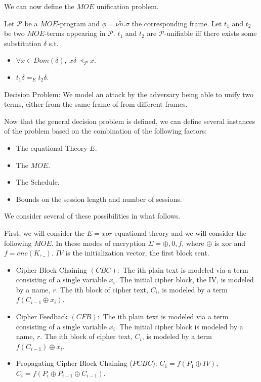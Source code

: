 \documentclass{llncs}
\begin{document}
We can now define the $MOE$ unification problem.

\begin{definition}
	Let $\mathcal{P}$ be a $MOE$-program and $\phi = \nu \tilde{n}.\sigma$ the corresponding frame. Let $t_1$ and $t_2$
	be two $MOE$-terms appearing in $\mathcal{P}$. $t_1$ and $t_2$
	are $\mathcal{P}$-unifiable iff there exists some substitution
	$\delta$ s.t.
	\begin{itemize}
		\item $\forall x \in Dom(\delta), ~x\delta \prec_{\mathcal{P}} x$.
		\item $t_1 \delta =_E t_2\delta$.
	\end{itemize}
\end{definition}


\begin{definition}
	Decision Problem: We model an attack by the adversary being able
	to unify two terms, either from the same frame of from different
	frames.  
\end{definition}

Now that the general decision problem is defined, we can define several
instances of the problem based on the combination of the following factors:
\begin{itemize}
	\item The equational Theory $E$.
	\item The $MOE$.
	\item The Schedule.
	\item Bounds on the session length and number of sessions.  
\end{itemize}

We consider several of these possibilities in what follows.

First, we will consider the $E=xor$ equational theory and we 
will consider the following $MOE$. In these modes of encryption 
$\Sigma ={\oplus, 0, f}$, where $\oplus$ is xor and $f=enc(K,\_)$.
$IV$ is the initialization vector, the first block sent. 
\begin{itemize}
	\item Cipher Block Chaining $(CBC):$ The ith plain text is modeled via a term consisting of a single variable $x_i$. The initial cipher block, the IV, is modeled by a name, $r$. The ith block of cipher text, $C_i$, is modeled by a
	term $f(C_{i-1} \oplus x_i)$.
	\item Cipher Feedback $(CFB):$ The ith plain text is modeled via a term consisting of a single variable $x_i$. The initial cipher block is modeled by a name, $r$. The ith block of cipher text, $C_i$, is modeled by a
	term $f(C_{i-1}) \oplus x_i$.  
	\item Propagating Cipher Block Chaining ($PCBC$): 
	$C_1 = f(P_1 \oplus IV)$, $C_i = f(P_i \oplus P_{i-1} \oplus C_{i-1})$.
\end{itemize}
\end{document}
